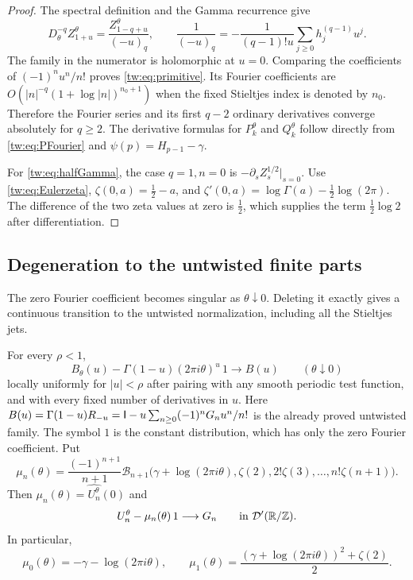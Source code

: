 \begin{proof}
The spectral definition and the Gamma recurrence give
\[
 D_\theta^{-q}Z_{1+u}^\theta
       =\frac{Z_{1-q+u}^\theta}{(-u)_q},\qquad
 \frac1{(-u)_q}
       =-\frac1{(q-1)!u}\sum_{j\ge0}h_j^{(q-1)}u^j.
\]
The family in the numerator is holomorphic at $u=0$. Comparing
the coefficients of $(-1)^nu^n/n!$ proves
\eqref{tw:eq:primitive}. Its Fourier coefficients are
$O(|n|^{-q}(1+\log|n|)^{n_0+1})$ when the fixed Stieltjes
index is denoted by $n_0$. Therefore the Fourier series and its
first $q-2$ ordinary derivatives converge absolutely for $q\ge2$.
The derivative formulas for $P_k^\theta$ and $Q_k^\theta$ follow
directly from \eqref{tw:eq:PFourier} and
$\psi(p)=H_{p-1}-\gamma$.

For \eqref{tw:eq:halfGamma}, the case $q=1,n=0$ is
$-\partial_s Z_s^{1/2}|_{s=0}$. Use
\eqref{tw:eq:Eulerzeta}, $\zeta(0,a)=\tfrac12-a$, and
$\zeta'(0,a)=\log\Gamma(a)-\tfrac12\log(2\pi)$.
The difference of the two zeta values at zero is $\tfrac12$,
which supplies the term $\tfrac12\log2$ after differentiation.
\end{proof}

\subsection{Degeneration to the untwisted finite parts}

The zero Fourier coefficient becomes singular as $\theta\downarrow0$.
Deleting it exactly gives a continuous transition to the untwisted
normalization, including all the Stieltjes jets.

\begin{theorem}
\label{tw:thm:zerolimit}
For every $\rho<1$,
\begin{equation}\label{tw:eq:Blimit}
 B_\theta(u)-\Gamma(1-u)(2\pi i\theta)^u\,1
                    \longrightarrow B(u)
 \qquad (\theta\downarrow0)
\end{equation}
locally uniformly for $|u|<\rho$ after pairing with any smooth
periodic test function, and with every fixed number of derivatives
in $u$. Here $B(u)=\Gamma(1-u)R_{-u}=\mathsf I-u\sum_{n\ge0}(-1)^nG_nu^n/n!$ is the already proved untwisted family. The symbol $1$ is the constant distribution, which has only the
zero Fourier coefficient. Put
\begin{equation}\label{tw:eq:meanjet}
 \mu_n(\theta)=\frac{(-1)^{n+1}}{n+1}
 \mathcal B_{n+1}\bigl(
    \gamma+\log(2\pi i\theta),\zeta(2),2!\zeta(3),
                              \ldots,n!\zeta(n+1)\bigr).
\end{equation}
Then $\mu_n(\theta)=\widehat{U_n^\theta}(0)$ and
\begin{equation}\label{tw:eq:Ulimit}
 U_n^\theta-\mu_n(\theta)\,1\longrightarrow G_n
                \qquad\hbox{in }\mathcal D'(\mathbb R/\mathbb Z).
\end{equation}
In particular,
\[
 \mu_0(\theta)=-\gamma-\log(2\pi i\theta),\qquad
 \mu_1(\theta)=\frac{(\gamma+\log(2\pi i\theta))^2+\zeta(2)}2.
\]
\end{theorem}

